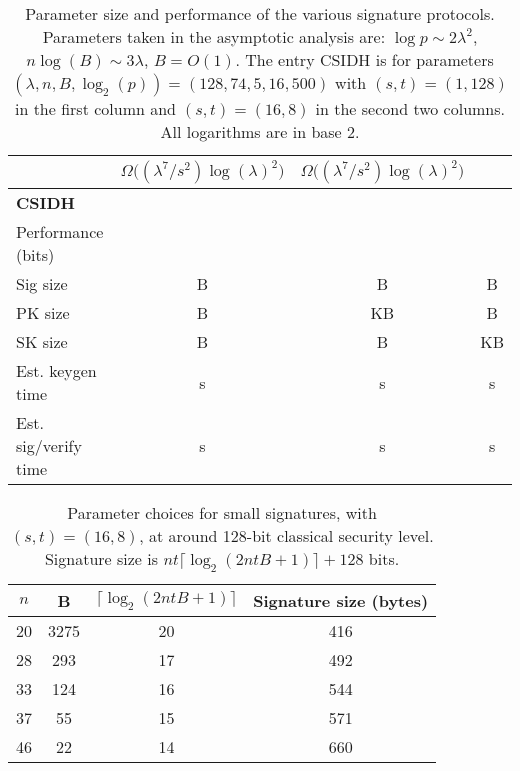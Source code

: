 \documentclass{llncs}
\begin{document}
\begin{landscape}
\begin{table}
\begin{tabular}{l | c | c | c |}
      & $\Omega\bigl((\lambda^7/s^2)\log(\lambda)^2\bigr)$
      & $\Omega\bigl((\lambda^7/s^2)\log(\lambda)^2\bigr)$\\
      \hline
      \hspace{1em}\textbf{CSIDH} &&&\\
      Performance (bits) &&&\\
      Sig size
      & \RejSig{} B & \ParSig{} B & \ComSig{} B\\
      PK size
      & \RejPK{} B & \ParPK{} KB & \ComPK{} B\\
      SK size
      & \RejSK{} B & \ParSK{} B & \ComSK{} KB \\
      Est. keygen time
      & \RejKG{} s & \ParKG{} s & \ComKG{} s\\
      Est. sig/verify time
      & \RejTime{} s & \ParTime{} s & \ComTime{} s
    \end{tabular}
    \caption{Parameter size and performance of the various signature
      protocols.
      Parameters taken in the asymptotic analysis are:
      $\log p \sim 2\lambda^2$, $n\log(B)\sim 3\lambda$, $B = O(1)$.
The entry CSIDH is for parameters $(\lambda,n,B,\log_2(p)) = (128, 74, 5, 16, 500)$ with $(s,t) = (1,128)$ in the first column and $(s,t)=(16,8)$ in the second two columns.
      All logarithms are in base 2.
    }
    \label{tab:comparison}
  \end{table}
\end{landscape}


\begin{table}
\begin{center}
\begin{tabular}{|c|c|c|c|} \hline
  $n$ & B & $\lceil \log_2( 2ntB + 1) \rceil$ & Signature size (bytes) \\
\hline
  20 & 3275 & 20 & 416 \\
  28 & 293 & 17 & 492 \\
  33 & 124 & 16 & 544 \\
  37 & 55 & 15 & 571 \\
  46 & 22 & 14 & 660 \\
\hline
\end{tabular}
\end{center}
\caption{Parameter choices for small signatures, with $(s,t)=(16,8)$, at around 128-bit classical security level. Signature size is $nt \lceil \log_2( 2ntB + 1) \rceil + 128$ bits. \label{tab:alt-params}}
\end{table}
\end{document}
